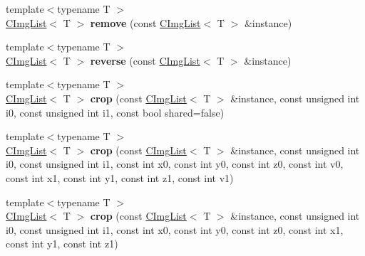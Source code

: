 \begin{DoxyCompactItemize}
\item 
\hypertarget{namespacecimg__library_a6e4a3dda40304a813526861bbae90965}{{\footnotesize template$<$typename T $>$ }\\\hyperlink{structcimg__library_1_1_c_img_list}{C\-Img\-List}$<$ T $>$ {\bfseries remove} (const \hyperlink{structcimg__library_1_1_c_img_list}{C\-Img\-List}$<$ T $>$ \&instance)}\label{namespacecimg__library_a6e4a3dda40304a813526861bbae90965}

\item 
\hypertarget{namespacecimg__library_a24d88b952dd5ac65db5044edc20cdd5c}{{\footnotesize template$<$typename T $>$ }\\\hyperlink{structcimg__library_1_1_c_img_list}{C\-Img\-List}$<$ T $>$ {\bfseries reverse} (const \hyperlink{structcimg__library_1_1_c_img_list}{C\-Img\-List}$<$ T $>$ \&instance)}\label{namespacecimg__library_a24d88b952dd5ac65db5044edc20cdd5c}

\item 
\hypertarget{namespacecimg__library_a4b18199b36dbf7194b2063e1265b2efe}{{\footnotesize template$<$typename T $>$ }\\\hyperlink{structcimg__library_1_1_c_img_list}{C\-Img\-List}$<$ T $>$ {\bfseries crop} (const \hyperlink{structcimg__library_1_1_c_img_list}{C\-Img\-List}$<$ T $>$ \&instance, const unsigned int i0, const unsigned int i1, const bool shared=false)}\label{namespacecimg__library_a4b18199b36dbf7194b2063e1265b2efe}

\item 
\hypertarget{namespacecimg__library_a96dfaeaed139ff8cb2f63334e9bf33d9}{{\footnotesize template$<$typename T $>$ }\\\hyperlink{structcimg__library_1_1_c_img_list}{C\-Img\-List}$<$ T $>$ {\bfseries crop} (const \hyperlink{structcimg__library_1_1_c_img_list}{C\-Img\-List}$<$ T $>$ \&instance, const unsigned int i0, const unsigned int i1, const int x0, const int y0, const int z0, const int v0, const int x1, const int y1, const int z1, const int v1)}\label{namespacecimg__library_a96dfaeaed139ff8cb2f63334e9bf33d9}

\item 
\hypertarget{namespacecimg__library_a71af87bc0b14c38fe47f9712b2c4781e}{{\footnotesize template$<$typename T $>$ }\\\hyperlink{structcimg__library_1_1_c_img_list}{C\-Img\-List}$<$ T $>$ {\bfseries crop} (const \hyperlink{structcimg__library_1_1_c_img_list}{C\-Img\-List}$<$ T $>$ \&instance, const unsigned int i0, const unsigned int i1, const int x0, const int y0, const int z0, const int x1, const int y1, const int z1)}\label{namespacecimg__library_a71af87bc0b14c38fe47f9712b2c4781e}


\end{DoxyCompactItemize}
